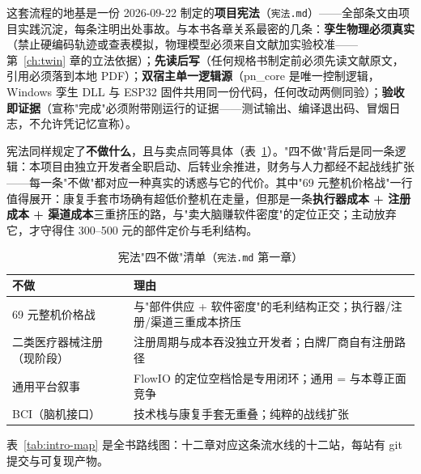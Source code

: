 这套流程的地基是一份 2026-09-22 制定的\textbf{项目宪法}（\texttt{宪法.md}）——全部条文由项目实践沉淀，每条注明出处事故。与本书各章关系最密的几条：\textbf{孪生物理必须真实}（禁止硬编码轨迹或查表模拟，物理模型必须来自文献加实验校准——第~\ref{ch:twin} 章的立法依据）；\textbf{先读后写}（任何规格书制定前必须先读文献原文，引用必须落到本地 PDF）；\textbf{双宿主单一逻辑源}（pn\_core 是唯一控制逻辑，Windows 孪生 DLL 与 ESP32 固件共用同一份代码，任何改动两侧同验）；\textbf{验收即证据}（宣称"完成"必须附带刚运行的证据——测试输出、编译退出码、冒烟日志，不允许凭记忆宣称）。

宪法同样规定了\textbf{不做什么}，且与卖点同等具体（表~\ref{tab:intro-not}）。"四不做"背后是同一条逻辑：本项目由独立开发者全职启动、后转业余推进，财务与人力都经不起战线扩张——每一条"不做"都对应一种真实的诱惑与它的代价。其中"69 元整机价格战"一行值得展开：康复手套市场确有超低价整机在走量，但那是一条\textbf{执行器成本 + 注册成本 + 渠道成本}三重挤压的路，与"卖大脑赚软件密度"的定位正交；主动放弃它，才守得住 300--500 元的部件定价与毛利结构。

\begin{table}[htbp]
  \centering
  \caption{宪法"四不做"清单（\texttt{宪法.md} 第一章）}
  \label{tab:intro-not}
  \begin{tabular}{lp{8.4cm}}
    \toprule
    不做 & 理由 \\
    \midrule
    69 元整机价格战 & 与"部件供应 + 软件密度"的毛利结构正交；执行器/注册/渠道三重成本挤压 \\
    二类医疗器械注册（现阶段） & 注册周期与成本吞没独立开发者；白牌厂商自有注册路径 \\
    通用平台叙事 & FlowIO 的定位空档恰是专用闭环；通用 = 与本尊正面竞争 \\
    BCI（脑机接口） & 技术栈与康复手套无重叠；纯粹的战线扩张 \\
    \bottomrule
  \end{tabular}
\end{table}

表~\ref{tab:intro-map} 是全书路线图：十二章对应这条流水线的十二站，每站有 git 提交与可复现产物。

